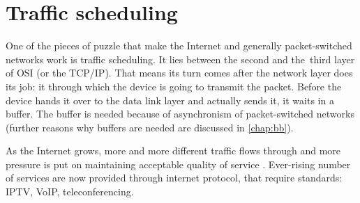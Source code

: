 \chapter{Traffic scheduling}
\label{chap:gf}
One of the pieces of puzzle that make the Internet and generally packet-switched networks work is traffic scheduling. It lies between the second and the~third layer of OSI (or the TCP/IP). That means its turn comes  after the network layer does  its job: it  through which the device is going to transmit the packet. Before the device hands it over to the data link layer and actually sends it, it waits in a buffer. The buffer is needed because of asynchronism of packet-switched networks (further reasons why buffers are needed are discussed in \autoref{chap:bb}).

As the Internet grows, more and more different traffic flows  through and more pressure is put on maintaining acceptable quality of service . Ever-rising number of services are now provided  through internet protocol, that require  standards: IPTV, VoIP, teleconferencing. %


